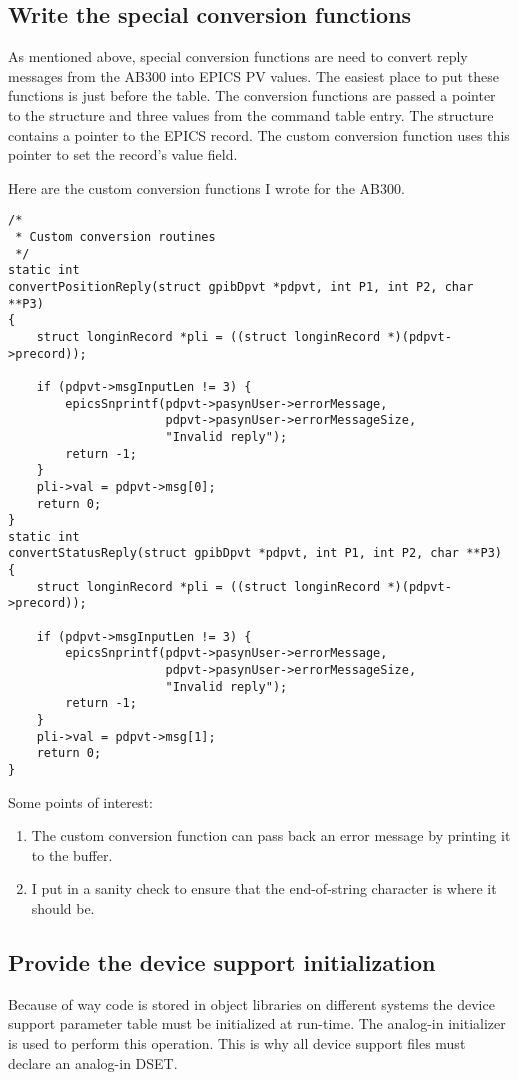 \documentclass[twoside]{article}
\begin{document}
\subsection{Write the special conversion functions}
As mentioned above, special conversion functions are need to convert reply
messages from the AB300 into EPICS PV values.
The easiest place to put these functions is just before the
\verb@gpibCmds@ table.
The conversion functions are passed a pointer to the \verb@gpibDpvt@ structure
and three values from the command table entry.
The \verb@gpibDpvt@ structure contains a pointer to the EPICS record.
The custom conversion function uses this pointer
to set the record's value field.

Here are the custom conversion functions I wrote for the AB300.
\begin{verbatim}
/*
 * Custom conversion routines
 */
static int
convertPositionReply(struct gpibDpvt *pdpvt, int P1, int P2, char **P3)
{
    struct longinRecord *pli = ((struct longinRecord *)(pdpvt->precord));

    if (pdpvt->msgInputLen != 3) {
        epicsSnprintf(pdpvt->pasynUser->errorMessage,
                      pdpvt->pasynUser->errorMessageSize,
                      "Invalid reply");
        return -1;
    }
    pli->val = pdpvt->msg[0];
    return 0;
}
static int
convertStatusReply(struct gpibDpvt *pdpvt, int P1, int P2, char **P3)
{
    struct longinRecord *pli = ((struct longinRecord *)(pdpvt->precord));

    if (pdpvt->msgInputLen != 3) {
        epicsSnprintf(pdpvt->pasynUser->errorMessage,
                      pdpvt->pasynUser->errorMessageSize,
                      "Invalid reply");
        return -1;
    }
    pli->val = pdpvt->msg[1];
    return 0;
}
\end{verbatim}

Some points of interest:
\begin{enumerate}
\item
The custom conversion function can pass back an error message by printing
it to the \verb@errorMessage@ buffer.
\item
I put in a sanity check to ensure that the end-of-string character is where
it should be.
\end{enumerate}





\subsection{Provide the device support initialization}
Because of way code is stored in object libraries on different systems
the device support parameter table must be initialized at run-time.  The
analog-in initializer is used to perform this operation.  This is why
all device support files must declare an analog-in DSET.
\end{document}
